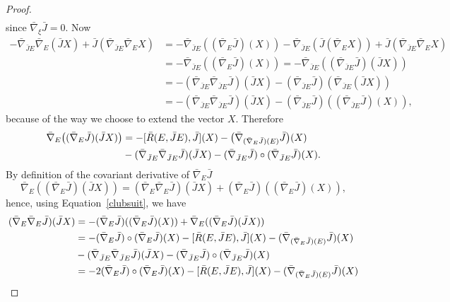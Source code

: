 \documentclass[a4paper,reqno]{amsart}
\theoremstyle{definition}
\theoremstyle{remark}
\theoremstyle{plain}
\numberwithin{equation}{section}
\begin{document}
\begin{proof}
\begin{align*}
\end{align*}
since $\bar{\nabla}_{\xi} \bar{J} =0$. Now 
\begin{align*}
-\bar{\nabla}_{\bar{J}E}\bar{\nabla}_E(\bar{J}X) +\bar{J} (\bar{\nabla}_{\bar{J}E}\bar{\nabla}_E X)
&= -\bar{\nabla}_{\bar{J}E}((\bar{\nabla}_E \bar{J})(X)) -\bar{\nabla}_{\bar{J}E}(\bar{J}(\bar{\nabla}_E X))+\bar{J} (\bar{\nabla}_{\bar{J}E}\bar{\nabla}_E X)\\
&= -\bar{\nabla}_{\bar{J}E}((\bar{\nabla}_E \bar{J})(X))
= - \bar{\nabla}_{\bar{J}E}((\bar{\nabla}_{\bar{J}E}\bar{J})(\bar{J}X))\\
&= - (\bar{\nabla}_{\bar{J}E}\bar{\nabla}_{\bar{J}E}\bar{J})(\bar{J}X)- (\bar{\nabla}_{\bar{J}E}\bar{J}) (\bar{\nabla}_{\bar{J}E}(\bar{J}X))\\
&= - (\bar{\nabla}_{\bar{J}E}\bar{\nabla}_{\bar{J}E}\bar{J})(\bar{J}X)- (\bar{\nabla}_{\bar{J}E}\bar{J})((\bar{\nabla}_{\bar{J}E}\bar{J})(X)),
\end{align*}
because of the way we choose to extend the vector $X$.
Therefore
\begin{align}  
\bar{\nabla}_E \big((\bar{\nabla}_E \bar{J}) (\bar{J}X)\big) &=-[\bar{R}(E,\bar{J}E),\bar{J}](X)-\big(\bar{\nabla}_{(\bar{\nabla}_E\bar{J})(E)}\bar{J}\big)(X)\label{clubsuit}\\
&-(\bar{\nabla}_{\bar{J}E}\bar{\nabla}_{\bar{J}E}\bar{J}) (\bar{J}X) - (\bar{\nabla}_{\bar{J}E}\bar{J})\circ(\bar{\nabla}_{\bar{J}E}\bar{J})(X)\notag.
\end{align}
By definition of the covariant derivative of $\bar{\nabla}_E \bar{J}$
$$
\bar{\nabla}_E ((\bar{\nabla}_E \bar{J}) (\bar{J}X))= (\bar{\nabla}_E
\bar{\nabla}_E \bar{J})(\bar{J}X)+(\bar{\nabla}_{E}\bar{J})(
(\bar{\nabla}_{E}\bar{J})(X)),
$$
hence, using Equation~\eqref{clubsuit}, we have
\begin{align}
(\bar{\nabla}_E \bar{\nabla}_E \bar{J})(\bar{J}X) 
&=  -(\bar{\nabla}_{E}\bar{J})((\bar{\nabla}_{E}\bar{J})(X))+\bar{\nabla}_E ((\bar{\nabla}_E \bar{J}) (\bar{J}X))\notag\\
&=  -(\bar{\nabla}_{E}\bar{J})\circ(\bar{\nabla}_{E}\bar{J})(X)-[\bar{R}(E,\bar{J}E),\bar{J}](X)-(\bar{\nabla}_{(\bar{\nabla}_E\bar{J})(E)}\bar{J})(X)\notag\\
&-(\bar{\nabla}_{\bar{J}E}\bar{\nabla}_{\bar{J}E}\bar{J}) (\bar{J}X)  - (\bar{\nabla}_{\bar{J}E}\bar{J})\circ(\bar{\nabla}_{\bar{J}E}\bar{J})(X)  \notag \\
&= -2(\bar{\nabla}_{E}\bar{J})\circ(\bar{\nabla}_{E}\bar{J})(X)-[\bar{R}(E,\bar{J}E),\bar{J}](X)-(\bar{\nabla}_{(\bar{\nabla}_E\bar{J})(E)}\bar{J})(X)\label{eqstar}\\

\end{align}
\end{proof}
\end{document}
